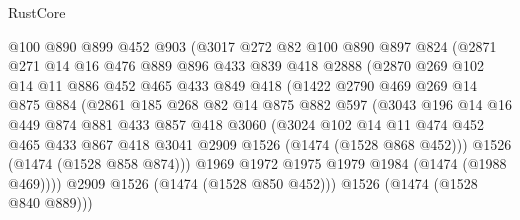 \begin{lexlean}{RustCore}
\begin{coremodule}
                @100
                @890
                @899
                @452
                @903
                (@3017
                  @272
                  @82
                  @100
                  @890
                  @897
                  @824
                  (@2871
                    @271
                    @14
                    @16
                    @476
                    @889
                    @896
                    @433
                    @839
                    @418
                    @2888
                    (@2870
                      @269
                      @102
                      @14
                      @11
                      @886
                      @452
                      @465
                      @433
                      @849
                      @418
                      (@1422
                        @2790
                        @469
                        @269
                        @14
                        @875
                        @884
                        (@2861
                          @185
                          @268
                          @82
                          @14
                          @875
                          @882
                          @597
                          (@3043
                            @196
                            @14
                            @16
                            @449
                            @874
                            @881
                            @433
                            @857
                            @418
                            @3060
                            (@3024
                              @102
                              @14
                              @11
                              @474
                              @452
                              @465
                              @433
                              @867
                              @418
                              @3041
                              @2909
                              @1526
                              (@1474 (@1528 @868 @452)))
                            @1526
                            (@1474 (@1528 @858 @874)))
                          @1969
                          @1972
                          @1975
                          @1979
                          @1984
                          (@1474 (@1988 @469))))
                      @2909
                      @1526
                      (@1474 (@1528 @850 @452)))
                    @1526
                    (@1474 (@1528 @840 @889)))

\end{coremodule}
\end{lexlean}
